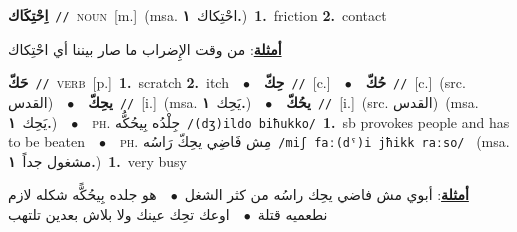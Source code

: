 \documentclass[10pt,a4paper,twoside]{article} %
\begin{document}
\begin{multicols}{2}
{\setlength\topsep{0pt}\textbf{\foreignlanguage{arabic}{اِحْتِكَاك}}\ {\color{gray}\texttt{//}\color{black}}\ \textsc{noun}\ [m.]\ \color{gray}(msa. \foreignlanguage{arabic}{احْتِكاك}~\foreignlanguage{arabic}{\textbf{١.}})\color{black}\ \textbf{1.}~friction  \textbf{2.}~contact\  \begin{flushright}\color{gray}\foreignlanguage{arabic}{\textbf{\underline{\foreignlanguage{arabic}{أمثلة}}}: من وقت الإِضراب ما صار بيننا أي احْتِكاك}\end{flushright}\color{black}} \vspace{2mm}

{\setlength\topsep{0pt}\textbf{\foreignlanguage{arabic}{حَكّ}}\ {\color{gray}\texttt{//}\color{black}}\ \textsc{verb}\ [p.]\ \textbf{1.}~scratch  \textbf{2.}~itch\ \ $\bullet$\ \ \setlength\topsep{0pt}\textbf{\foreignlanguage{arabic}{حِكّ}}\ {\color{gray}\texttt{//}\color{black}}\ [c.]\ \ $\bullet$\ \ \setlength\topsep{0pt}\textbf{\foreignlanguage{arabic}{حُكّ}}\ {\color{gray}\texttt{//}\color{black}}\ [c.]\ (src. \color{gray}\foreignlanguage{arabic}{القدس}\color{black})\ \ $\bullet$\ \ \setlength\topsep{0pt}\textbf{\foreignlanguage{arabic}{يحِكّ}}\ {\color{gray}\texttt{//}\color{black}}\ [i.]\ \color{gray}(msa. \foreignlanguage{arabic}{يَحِك}~\foreignlanguage{arabic}{\textbf{١.}})\color{black}\ \ $\bullet$\ \ \setlength\topsep{0pt}\textbf{\foreignlanguage{arabic}{يحُكّ}}\ {\color{gray}\texttt{//}\color{black}}\ [i.]\ (src. \color{gray}\foreignlanguage{arabic}{القدس}\color{black})\ \color{gray}(msa. \foreignlanguage{arabic}{يَحِك}~\foreignlanguage{arabic}{\textbf{١.}})\color{black}\ \ $\bullet$\ \ \textsc{ph.} \color{gray} \foreignlanguage{arabic}{جِلْدُه بِيحُكُّه}\color{black}\ {\color{gray}\texttt{/{\sffamily (dʒ)ildo biħukko}/}\color{black}}\ \textbf{1.}~sb provokes people and has to be beaten\ \ $\bullet$\ \ \textsc{ph.} \color{gray} \foreignlanguage{arabic}{مِش فَاضِي يحِكّ رَاسُه}\color{black}\ {\color{gray}\texttt{/{\sffamily miʃ faː(dˤ)i jħikk raːso}/}\color{black}}\ \color{gray} (msa. \foreignlanguage{arabic}{مشغول جداً}~\foreignlanguage{arabic}{\textbf{١.}})\color{black}\ \textbf{1.}~very busy\  \begin{flushright}\color{gray}\foreignlanguage{arabic}{\textbf{\underline{\foreignlanguage{arabic}{أمثلة}}}: أبوي مش فاضي يحِك راسُه من كثر الشغل\ $\bullet$\ \  هو جلده بِيحُكًّه شكله لازم نطعميه قتلة\ $\bullet$\ \  اوعك تحِك عينك ولا بلاش بعدين تلتهب}\end{flushright}\color{black}} \vspace{2mm}


\end{multicols}
\end{document}
